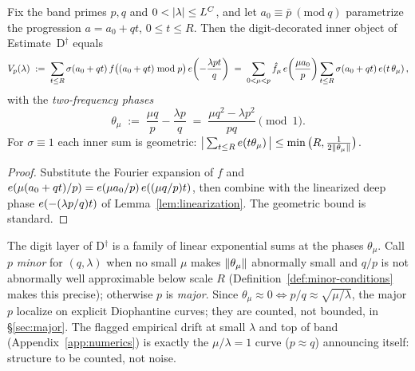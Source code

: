\begin{proposition}\label{prop:two-freq}
\statusPM\quad
Fix the band primes $p,q$ and $0<|\lambda|\le\Llog^C$, and let
$a_0\equiv\bar p\ (\mathrm{mod}\ q)$ parametrize the progression
$a=a_0+qt$, $0\le t\le R$. Then the digit-decorated inner object of
Estimate~D$^\dagger$ equals
\[
V_p(\lambda)\;:=\;\sum_{t\le R}\sigma(a_0+qt)\,
f\big((a_0+qt)\bmod p\big)\,e\!\left(-\frac{\lambda pt}{q}\right)
\;=\;\sum_{0<\mu<p}\hat f_\mu\,e\!\left(\frac{\mu a_0}{p}\right)
\sum_{t\le R}\sigma(a_0+qt)\,e\!\left(t\,\theta_\mu\right),
\]
with the \emph{two-frequency phases}
\[
\theta_\mu\;:=\;\frac{\mu q}{p}-\frac{\lambda p}{q}
\;=\;\frac{\mu q^2-\lambda p^2}{pq}\pmod 1 .
\]
For $\sigma\equiv1$ each inner sum is geometric:
$\big|\sum_{t\le R}e\!\left(t\theta_\mu\right)\big|\le\min\big(R,\tfrac1{2\left\| \theta_\mu\right\|}\big)$.
\end{proposition}

\begin{proof}
Substitute the Fourier expansion of $f$ and
$e\!\left(\mu(a_0+qt)/p\right)=e\!\left(\mu a_0/p\right)e\!\left((\mu q/p)t\right)$, then combine with the
linearized deep phase $e\!\left(-(\lambda p/q)t\right)$ of
Lemma~\ref{lem:linearization}. The geometric bound is standard.
\end{proof}

\begin{definition}\label{def:dichotomy}
The digit layer of D$^\dagger$ is a family of linear exponential sums at
the phases $\theta_\mu$. Call $p$ \emph{minor} for $(q,\lambda)$ when no
small $\mu$ makes $\left\| \theta_\mu\right\|$ abnormally small and $q/p$ is not
abnormally well approximable below scale $R$
(Definition~\ref{def:minor-conditions} makes this precise); otherwise
$p$ is \emph{major}. Since
$\theta_\mu\approx0\iff p/q\approx\sqrt{\mu/\lambda}$, the major $p$
localize on explicit Diophantine curves; they are counted, not bounded,
in \S\ref{sec:major}. The flagged empirical drift at small
$\lambda$ and top of band (Appendix~\ref{app:numerics}) is exactly the
$\mu/\lambda=1$ curve ($p\approx q$) announcing itself: structure to be
counted, not noise.
\end{definition}
